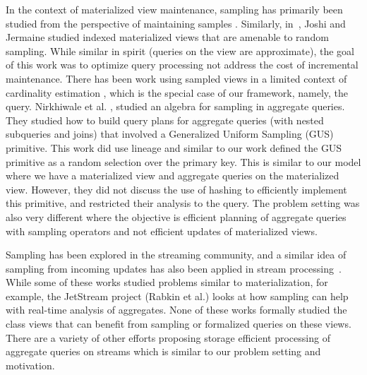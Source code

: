In the context of materialized view maintenance, sampling has primarily been studied from the perspective of maintaining samples \cite{DBLP:conf/icde/OlkenR92}.
Similarly, in~\cite{joshi2008materialized}, Joshi and Jermaine studied indexed materialized views that are amenable to random sampling.
While similar in spirit (queries on the view are approximate), the goal of this work was to optimize query processing not address the cost of incremental maintenance.
There has been work using sampled views in a limited context of cardinality estimation \cite{larson2007cardinality}, which is the special case of our framework, namely, the \countfunc query.
Nirkhiwale et al. \cite{DBLP:journals/pvldb/NirkhiwaleDJ13}, studied an algebra for sampling in aggregate queries.
They studied how to build query plans for aggregate queries (with nested subqueries and joins) that involved a Generalized Uniform Sampling (GUS) primitive.
This work did use lineage and similar to our work defined the GUS primitive as a random selection over the primary key.
This is similar to our model where we have a materialized view and aggregate queries on the materialized view.
However, they did not discuss the use of hashing to efficiently implement this primitive, and restricted their analysis to the \sumfunc query.
The problem setting was also very different where the objective is efficient planning of aggregate queries with sampling operators and not efficient updates of materialized views.

Sampling has been explored in the streaming community, and a similar idea of sampling from incoming updates has also been applied in stream processing~\cite{tatbul2003load, Garofalakis, rabkin2014aggregation}.
While some of these works studied problems similar to materialization, for example, the JetStream project (Rabkin et al.) looks at how sampling can help with real-time analysis of aggregates.
None of these works formally studied the class views that can benefit from sampling or formalized queries on these views.
There are a variety of other efforts proposing storage efficient processing of aggregate queries on streams \cite{dobra2002processing, greenwald2001space} which is similar to our problem setting and motivation.

